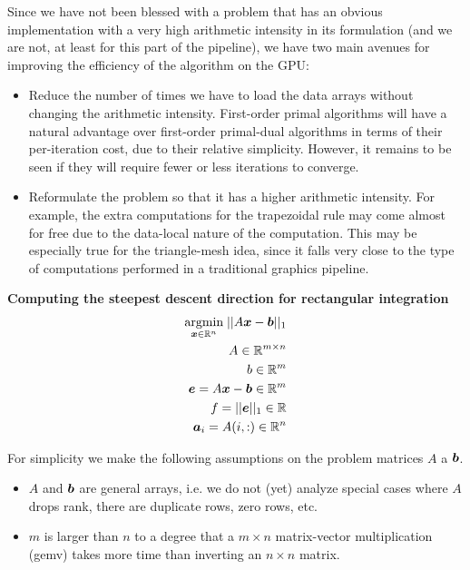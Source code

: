 \documentclass[9.5pt,journal,final,finalsubmission,twocolumn]{IEEEtran}
\begin{document}
Since we have not been blessed with a problem that has an obvious
implementation with a very high arithmetic intensity in its formulation (and we
are not, at least for this part of the pipeline), we have two main avenues for
improving the efficiency of the algorithm on the GPU:

\begin{itemize}
\item Reduce the number of times we have to load the data arrays without
changing the arithmetic intensity.  First-order primal algorithms will have a
natural advantage over first-order primal-dual algorithms in terms of their
per-iteration cost, due to their relative simplicity.  However, it remains to
be seen if they will require fewer or less iterations to converge.

\item Reformulate the problem so that it has a higher arithmetic intensity.
For example, the extra computations for the trapezoidal rule may come almost
for free due to the data-local nature of the computation.  This may be
especially true for the triangle-mesh idea, since it falls very close to the
type of computations performed in a traditional graphics pipeline.

\end{itemize}

{\bf Computing the steepest descent direction for rectangular integration }
\begin{eqnarray}
{\hbox{$\underset{{\boldsymbol{x}}\in \mathbb R^n}{\mbox{argmin}}\;$}} ||A {\boldsymbol{x}} - \boldsymbol{b}||_1 \\
A \in \mathbb R^{m \times n}\\
b \in \mathbb R^m \\
\boldsymbol{e} = A {\boldsymbol{x}} - \boldsymbol{b} \in \mathbb R^m\\
f = ||\boldsymbol{e}||_1 \in \mathbb R \\
\boldsymbol{a}_i = A(i,:) \in \mathbb R^{n}\\
\end{eqnarray}

For simplicity we make the following assumptions on the problem matrices $A$ a $\boldsymbol{b}$.
\begin{itemize}
\item $A$ and $\boldsymbol{b}$ are general arrays, i.e. we do not (yet) analyze special cases
where $A$ drops rank, there are duplicate rows, zero rows, etc.
\item $m$ is larger than $n$ to a degree that a $m \times n$ matrix-vector multiplication (gemv)
takes more time than inverting an $n\times n$ matrix.  
\end{itemize}
\end{document}
